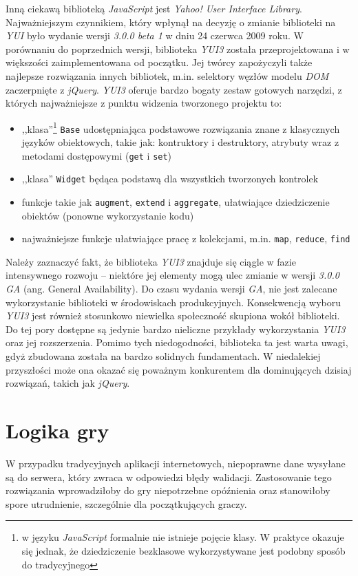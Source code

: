 \documentclass[11pt,twoside]{report}
\begin{document}
Inną ciekawą biblioteką \emph{JavaScript} jest \emph{Yahoo! User
  Interface Library}. Najważniejszym czynnikiem, który wpłynął na
decyzję o zmianie biblioteki na \emph{YUI} było wydanie wersji
\emph{3.0.0 beta 1} w dniu 24 czerwca 2009 roku. W porównaniu do
poprzednich wersji, biblioteka \emph{YUI3} została przeprojektowana i
w większości zaimplementowana od początku. Jej twórcy zapożyczyli
także najlepsze rozwiązania innych bibliotek, m.in. selektory węzłów
modelu \emph{DOM} zaczerpnięte z \emph{jQuery}. \emph{YUI3} oferuje
bardzo bogaty zestaw gotowych narzędzi, z których najważniejsze z
punktu widzenia tworzonego projektu to:

\begin{itemize}
\item ,,klasa''\footnote{w języku \emph{JavaScript} formalnie nie
    istnieje pojęcie klasy. W praktyce okazuje się jednak, że
    dziedziczenie bezklasowe wykorzystywane jest podobny sposób do
    tradycyjnego} \texttt{Base} udostępniająca podstawowe rozwiązania
  znane z klasycznych języków obiektowych, takie jak: kontruktory i
  destruktory, atrybuty wraz z metodami dostępowymi (\texttt{get} i
  \texttt{set})
\item ,,klasa'' \texttt{Widget} będąca podstawą dla wszystkich
  tworzonych kontrolek
\item funkcje takie jak \texttt{augment}, \texttt{extend} i
  \texttt{aggregate}, ułatwiające dziedziczenie obiektów (ponowne
  wykorzystanie kodu)
\item najważniejsze funkcje ułatwiające pracę z kolekcjami,
  m.in. \texttt{map}, \texttt{reduce}, \texttt{find}
\end{itemize}

Należy zaznaczyć fakt, że biblioteka \emph{YUI3} znajduje się ciągle w
fazie intensywnego rozwoju -- niektóre jej elementy mogą ulec zmianie
w wersji \emph{3.0.0 GA} (ang. General Availability). Do czasu wydania
wersji \emph{GA}, nie jest zalecane wykorzystanie biblioteki w
środowiskach produkcyjnych. Konsekwencją wyboru \emph{YUI3} jest
również stosunkowo niewielka społeczność skupiona wokół biblioteki. Do
tej pory dostępne są jedynie bardzo nieliczne przykłady wykorzystania
\emph{YUI3} oraz jej rozszerzenia. Pomimo tych niedogodności,
biblioteka ta jest warta uwagi, gdyż zbudowana została na bardzo
solidnych fundamentach. W niedalekiej przyszłości może ona okazać się
poważnym konkurentem dla dominujących dzisiaj rozwiązań, takich jak
\emph{jQuery}.

\section{Logika gry}
W przypadku tradycyjnych aplikacji internetowych, niepoprawne dane
wysyłane są do serwera, który zwraca w odpowiedzi błędy
walidacji. Zastosowanie tego rozwiązania wprowadziłoby do gry
niepotrzebne opóźnienia oraz stanowiłoby spore utrudnienie,
szczególnie dla początkujących graczy.
\end{document}
